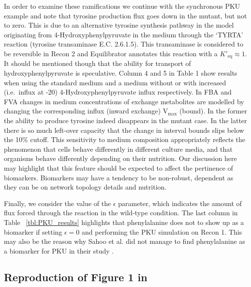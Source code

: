 \documentclass[10pt,a4paper,onecolumn]{article}
\begin{document}
In order to examine these ramifications we continue with the synchronous
PKU example and note that tyrosine production flux goes down in the
mutant, but not to zero. This is due to an alternative tyrosine
synthesis pathway in the model originating from 4-Hydroxyphenylpyruvate
in the medium through the `TYRTA' reaction (tyrosine transaminase E.C.
2.6.1.5). This transaminase is considered to be reversible in Recon 2
and Equilibrator \autocite{Noor2012} annotates this reaction with a
\(K'_{\text{eq}} \approx 1\). It should be mentioned though that the
ability for transport of hydroxyphenylpyruvate is speculative. Column 4
and 5 in Table 1 show results when using the standard medium and a
medium without or with increased (i.e.~influx at -20)
4-Hydroxyphenylpyruvate influx respectively. In FBA and FVA changes in
medium concentrations of exchange metabolites are modelled by changing
the corresponding influx (inward exchange) V\(_{\text{max}}\) (bound).
In the former the ability to produce tyrosine indeed disappears in the
mutant case. In the latter there is so much left-over capacity that the
change in interval bounds slips below the 10\% cutoff. This sensitivity
to medium composition appropriately reflects the phenomenon that cells
behave differently in different culture media, and that organisms behave
differently depending on their nutrition. Our discussion here may
highlight that this feature should be expected to affect the pertinence
of biomarkers. Biomarkers may have a tendency to be non-robust,
dependent as they can be on network topology details and nutrition.

Finally, we consider the value of the \(\epsilon\) parameter, which
indicates the amount of flux forced through the reaction in the
wild-type condition. The last column in Table ~\ref{tbl:PKU_results}
highlights that phenylalanine does not to show up as a biomarker if
setting \(\epsilon = 0\) and performing the PKU simulation on Recon 1.
This may also be the reason why Sahoo et al. did not manage to find
phenylalanine as a biomarker for PKU in their study
\autocite{Sahoo2012}.

\subsection{\texorpdfstring{Reproduction of Figure 1 in
\autocite{Shlomi2009}}{Reproduction of Figure 1 in {[}@Shlomi2009{]}}}\label{reproduction-of-figure-1-in-shlomi2009}
\end{document}
